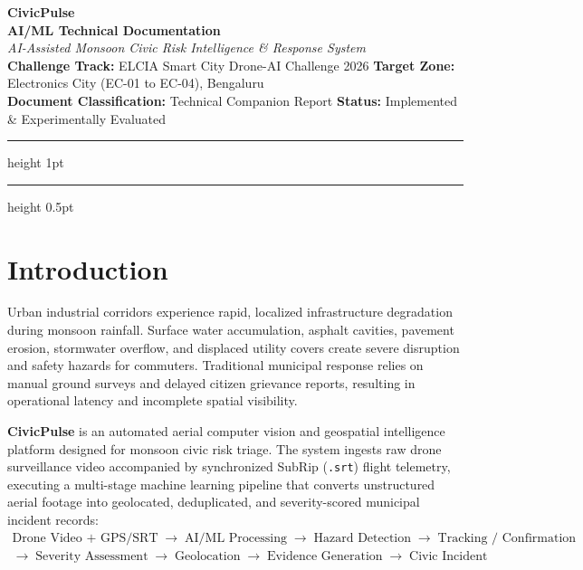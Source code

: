 \documentclass[12pt,a4paper]{article}
\begin{document}
\begin{center}
    {\Huge\bfseries\color{civicdark} CivicPulse}\\[0.2cm]
    {\LARGE\bfseries\color{civicblue} AI/ML Technical Documentation}\\[0.15cm]
    {\large\textit{AI-Assisted Monsoon Civic Risk Intelligence \& Response System}}\\[0.35cm]
    
    \textbf{Challenge Track:} ELCIA Smart City Drone-AI Challenge 2026 \quad\textbullet\quad
    \textbf{Target Zone:} Electronics City (EC-01 to EC-04), Bengaluru\\[0.1cm]
    \textbf{Document Classification:} Technical Companion Report \quad\textbullet\quad
    \textbf{Status:} Implemented \& Experimentally Evaluated
    \vspace{0.3cm}
    \hrule height 1pt
\end{center}

\tableofcontents
\vspace{0.4cm}
\hrule height 0.5pt
\clearpage

\section{Introduction}

Urban industrial corridors experience rapid, localized infrastructure degradation during monsoon rainfall. Surface water accumulation, asphalt cavities, pavement erosion, stormwater overflow, and displaced utility covers create severe disruption and safety hazards for commuters. Traditional municipal response relies on manual ground surveys and delayed citizen grievance reports, resulting in operational latency and incomplete spatial visibility.

\textbf{CivicPulse} is an automated aerial computer vision and geospatial intelligence platform designed for monsoon civic risk triage. The system ingests raw drone surveillance video accompanied by synchronized SubRip (\texttt{.srt}) flight telemetry, executing a multi-stage machine learning pipeline that converts unstructured aerial footage into geolocated, deduplicated, and severity-scored municipal incident records:
\[
\begin{gathered}
\text{Drone Video + GPS/SRT} \;\longrightarrow\; \text{AI/ML Processing} \;\longrightarrow\; \text{Hazard Detection} \;\longrightarrow\; \text{Tracking / Confirmation} \\
\longrightarrow\; \text{Severity Assessment} \;\longrightarrow\; \text{Geolocation} \;\longrightarrow\; \text{Evidence Generation} \;\longrightarrow\; \text{Civic Incident}
\end{gathered}
\]
\end{document}
